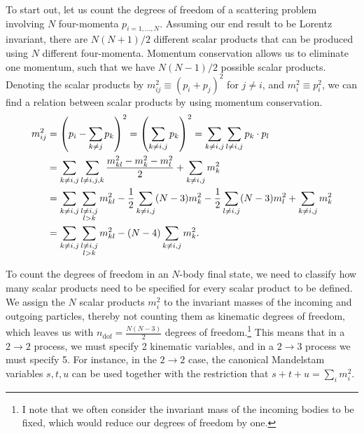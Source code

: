 \documentclass[../main.tex]{subfiles}
\begin{document}
To start out, let us count the degrees
of freedom of a scattering problem involving \(N\) four-momenta
\(p_{i=1,\ldots,N}\).
Assuming our end result to be Lorentz invariant, there are \(N(N+1)/2\) different scalar products that can be produced using \(N\) different four-momenta.
Momentum conservation allows us to eliminate one momentum, such that we have \(N(N-1)/2\) possible scalar products.
Denoting the scalar products by \(m^2_{ij} \equiv (p_i + p_j)^2\) for \(j \neq i\), and \(m^2_i \equiv p_i^2\), we can find a relation between scalar products by using momentum conservation.
\begin{align}
  \label{pc:eq:generalised_mandelstam_relation}
  \nonumber
  m^2_{ij} & = \left(p_i - \sum_{k\neq j} p_k\right)^2 =
  \left(\sum_{k\neq i,j} p_k\right)^2 = \sum_{k\neq i,j} \sum_{l\neq i,j}
  p_k\cdot
  p_l
  \\
  \nonumber
           & = \sum_{k\neq i,j} \sum_{l\neq i,j,k} \frac{m^2_{kl} - m^2_k
  - m^2_l}{2} + \sum_{k\neq i,j} m^2_k
  \\
  \nonumber
           & = \sum_{k\neq i,j} \sum_{\substack{l\neq i,j
  \\l>k}} m^2_{kl}
  - \frac{1}{2} \sum_{k\neq i, j} (N-3) m^2_k - \frac{1}{2} \sum_{l\neq
    i,j}
  (N-3) m^2_l + \sum_{k\neq i,j} m^2_k
  \\
           & = \sum_{k\neq i,j} \sum_{\substack{l\neq i,j
  \\l>k}} m^2_{kl}
  - (N-4) \sum_{k\neq i, j} m^2_k.
\end{align}

To count the degrees of freedom in an \(N\)-body final state, we need to classify how many scalar products need to be specified for every scalar product to be defined.
We assign the \(N\) scalar products \(m^2_i\) to the invariant masses of the incoming and outgoing particles, thereby not counting them as kinematic degrees of freedom, which leaves us with \(n_\text{dof} = \frac{N(N-3)}{2}\) degrees of freedom.\footnote{I note that we
  often consider the invariant mass of the incoming bodies to be fixed, which would reduce our degrees of freedom by one.}
This means that in a \(2\to 2\) process, we must specify 2 kinematic variables, and in a \(2\to 3\) process we must specify 5.
For instance, in the \(2\to 2\) case, the canonical Mandelstam variables \(s, t, u\) can be used together with the restriction that \(s+t+u = \sum_i m_i^2\).
\end{document}
